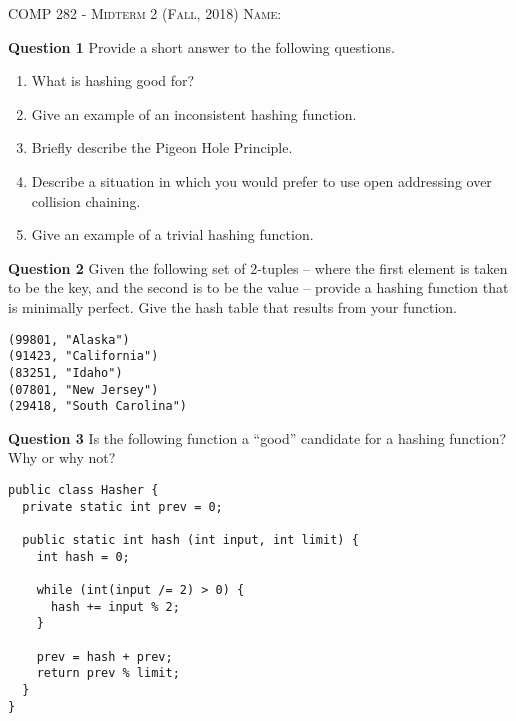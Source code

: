 \documentclass{letter}
\newcommand{\heading}[1]{{\large \textsc{#1}}}
\begin{document}
\heading{COMP 282 - Midterm 2 (Fall, 2018)}
\kern 2cm
\heading{Name:}

{\bf Question 1} \kern 1cm Provide a short answer to the following questions.

\begin{enumerate}[label=(\alph*)]

\item What is hashing good for?

\vspace{3cm}

\item Give an example of an inconsistent hashing function.

\vspace{3cm}

\item Briefly describe the Pigeon Hole Principle.

\vspace{3cm}

\item Describe a situation in which you would prefer to use open addressing over
collision chaining.

\vspace{3cm}

\item Give an example of a trivial hashing function.

\end{enumerate}

\clearpage

{\bf Question 2} \kern 1cm Given the following set of 2-tuples -- where the
first element is taken to be the key, and the second is to be the value --
provide a hashing function that is minimally perfect.  Give the hash table that
results from your function.

\begin{verbatim}
(99801, "Alaska")
(91423, "California")
(83251, "Idaho")
(07801, "New Jersey")
(29418, "South Carolina")
\end{verbatim}

\clearpage

{\bf Question 3} \kern 1cm Is the following function a ``good'' candidate for a
hashing function?  Why or why not?

\begin{verbatim}
public class Hasher {
  private static int prev = 0;

  public static int hash (int input, int limit) {
    int hash = 0;

    while (int(input /= 2) > 0) {
      hash += input % 2;
    }

    prev = hash + prev;
    return prev % limit;
  }
}
\end{verbatim}
\end{document}
